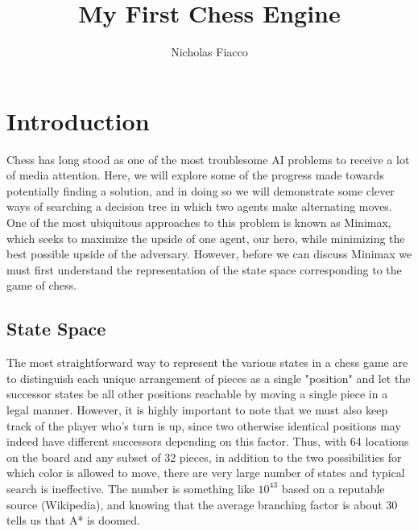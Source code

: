 \documentclass[11pt, oneside]{article}%
\title{My First Chess Engine}
\author{Nicholas Fiacco}
\begin{document}
\maketitle

\section{Introduction}
Chess has long stood as one of the most troublesome AI problems to receive a lot of media attention.  Here, we will explore some of the progress made towards potentially finding a solution, and in doing so we will demonstrate some clever ways of searching a decision tree in which two agents make alternating moves.  One of the most ubiquitous approaches to this problem is known as Minimax, which seeks to maximize the upside of one agent, our hero, while minimizing the best possible upside of the adversary.  However, before we can discuss Minimax we must first understand the representation of the state space corresponding to the game of chess.
\subsection{State Space}
The most straightforward way to represent the various states in a chess game are to distinguish each unique arrangement of pieces as a single "position" and let the successor states be all other positions reachable by moving a single piece in a legal manner.  However, it is highly important to note that we must also keep track of the player who's turn is up, since two otherwise identical positions may indeed have different successors depending on this factor.  Thus, with 64 locations on the board and any subset of 32 pieces, in addition to the two possibilities for which color is allowed to move, there are very large number of states and typical search is ineffective.  The number is something like $10^{43}$ based on a reputable source (Wikipedia), and knowing that the average branching factor is about 30 tells us that A* is doomed.
\end{document}
